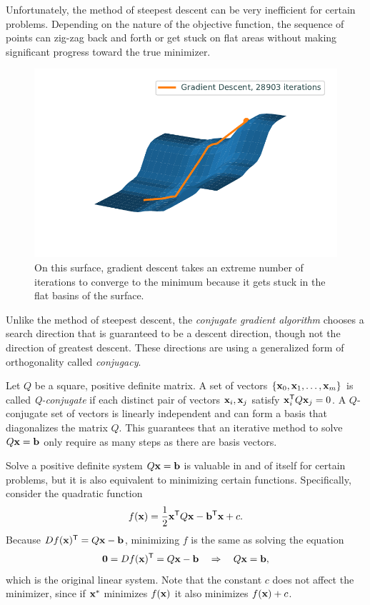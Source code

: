 Unfortunately, the method of steepest descent can be very inefficient for certain problems.
Depending on the nature of the objective function, the sequence of points can zig-zag back and forth or get stuck on flat areas without making significant progress toward the true minimizer.

\begin{figure}[H]
\centering
\includegraphics[width=.7\textwidth]{figures/steepest.pdf}
\caption{On this surface, gradient descent takes an extreme number of iterations to converge to the minimum because it gets stuck in the flat basins of the surface.}
\label{basis:steepest}
\end{figure}

Unlike the method of steepest descent, the \emph{conjugate gradient algorithm} chooses a search direction that is guaranteed to be a descent direction, though not the direction of greatest descent.
These directions are using a generalized form of orthogonality called \emph{conjugacy}.

Let $Q$ be a square, positive definite matrix.
A set of vectors $\{\mathbf{x}_0, \mathbf{x}_1, \ldots, \mathbf{x}_m\}$ is called \emph{Q-conjugate} if each distinct pair of vectors $\mathbf{x}_i,\mathbf{x}_j$ satisfy $\mathbf{x}_i^{\mathsf T} Q\mathbf{x}_j = 0$.
A $Q$-conjugate set of vectors is linearly independent and can form a basis that diagonalizes the matrix $Q$.
This guarantees that an iterative method to solve $Q\mathbf{x} = \mathbf{b}$ only require as many steps as there are basis vectors.

Solve a positive definite system $Q\mathbf{x} = \mathbf{b}$ is valuable in and of itself for certain problems, but it is also equivalent to minimizing certain functions.
Specifically, consider the quadratic function
\[
f(\mathbf{x}) = \frac{1}{2}\mathbf{x}^{\mathsf T} Q\mathbf{x} - \mathbf{b}^{\mathsf T}\mathbf{x} + c.
\]
Because $Df(\mathbf{x})^{\mathsf T} = Q\mathbf{x} - \mathbf{b}$, minimizing $f$ is the same as solving the equation
\[
\mathbf{0} = Df(\mathbf{x})^{\mathsf T} = Q\mathbf{x} - \mathbf{b}\quad\Rightarrow\quad Q\mathbf{x} = \mathbf{b},
\]
which is the original linear system.
Note that the constant $c$ does not affect the minimizer, since if $\mathbf{x}^*$ minimizes $f(\mathbf{x})$ it also minimizes $f(\mathbf{x})+c$.

